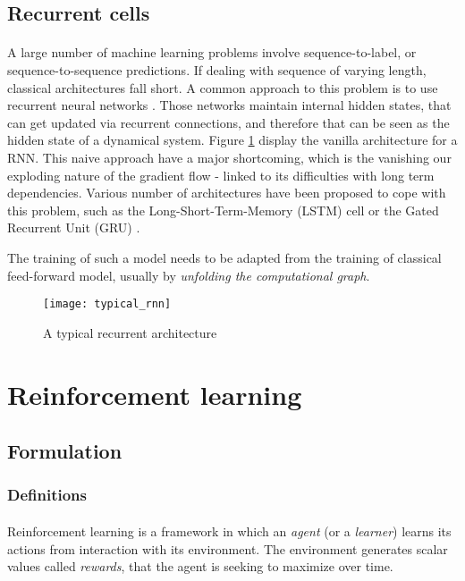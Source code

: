 {{{			}
			
			\subsection{Recurrent cells}
			{
				\paragraph{} A large number of machine learning problems involve sequence-to-label, or sequence-to-sequence predictions. If dealing with sequence of varying length, classical architectures fall short. A common approach to this problem is to use recurrent neural networks \cite{funahashi1993approximation}. Those networks maintain internal hidden states, that can get updated via recurrent connections, and therefore that can be seen as the hidden state of a dynamical system. Figure \ref{fig::rnn} display the vanilla architecture for a RNN. This naive approach have a major shortcoming, which is the vanishing our exploding nature of the gradient flow \cite{bengio1994learning} - linked to its  difficulties with long term dependencies. Various number of architectures have been proposed to cope with this problem, such as the Long-Short-Term-Memory (LSTM) cell \cite{hochreiter1997long} or the  Gated Recurrent Unit (GRU) \cite{chung2014empirical}.
				
				The training of such a model needs to be adapted from the training of classical feed-forward model, usually by \emph{unfolding the computational graph}. 
				
				\begin{figure}[h!]
					\begin{center}
						\texttt{[image: typical\_rnn]}
						\caption{A typical recurrent architecture}
						\label{fig::rnn}	
					\end{center}
				\end{figure}	
			}
		}
		\section{Reinforcement learning}
		{
			\subsection{Formulation}
			{
							\subsubsection{Definitions}
			{
				\paragraph{} Reinforcement learning is a framework in which an \emph{agent} (or a \emph{learner}) learns its actions from interaction with its environment. The environment generates scalar values called \emph{rewards}, that the agent is seeking to maximize over time. 
			
}}}}
